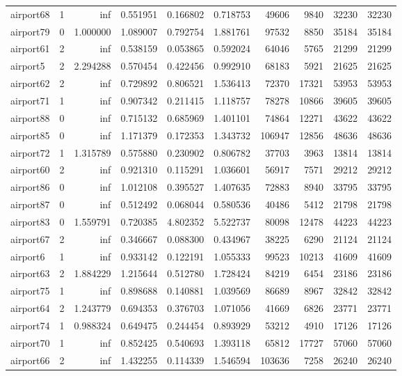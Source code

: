 \begin{longtable}{|l|r|r|r|r|r|r|r|r|r|}
airport68 & 1 & inf & 0.551951 & 0.166802 & 0.718753 & 49606 & 9840 & 32230 & 32230 \\
airport79 & 0 & 1.000000 & 1.089007 & 0.792754 & 1.881761 & 97532 & 8850 & 35184 & 35184 \\
airport61 & 2 & inf & 0.538159 & 0.053865 & 0.592024 & 64046 & 5765 & 21299 & 21299 \\
airport5 & 2 & 2.294288 & 0.570454 & 0.422456 & 0.992910 & 68183 & 5921 & 21625 & 21625 \\
airport62 & 2 & inf & 0.729892 & 0.806521 & 1.536413 & 72370 & 17321 & 53953 & 53953 \\
airport71 & 1 & inf & 0.907342 & 0.211415 & 1.118757 & 78278 & 10866 & 39605 & 39605 \\
airport88 & 0 & inf & 0.715132 & 0.685969 & 1.401101 & 74864 & 12271 & 43622 & 43622 \\
airport85 & 0 & inf & 1.171379 & 0.172353 & 1.343732 & 106947 & 12856 & 48636 & 48636 \\
airport72 & 1 & 1.315789 & 0.575880 & 0.230902 & 0.806782 & 37703 & 3963 & 13814 & 13814 \\
airport60 & 2 & inf & 0.921310 & 0.115291 & 1.036601 & 56917 & 7571 & 29212 & 29212 \\
airport86 & 0 & inf & 1.012108 & 0.395527 & 1.407635 & 72883 & 8940 & 33795 & 33795 \\
airport87 & 0 & inf & 0.512492 & 0.068044 & 0.580536 & 40486 & 5412 & 21798 & 21798 \\
airport83 & 0 & 1.559791 & 0.720385 & 4.802352 & 5.522737 & 80098 & 12478 & 44223 & 44223 \\
airport67 & 2 & inf & 0.346667 & 0.088300 & 0.434967 & 38225 & 6290 & 21124 & 21124 \\
airport6 & 1 & inf & 0.933142 & 0.122191 & 1.055333 & 99523 & 10213 & 41609 & 41609 \\
airport63 & 2 & 1.884229 & 1.215644 & 0.512780 & 1.728424 & 84219 & 6454 & 23186 & 23186 \\
airport75 & 1 & inf & 0.898688 & 0.140881 & 1.039569 & 86689 & 8967 & 32842 & 32842 \\
airport64 & 2 & 1.243779 & 0.694353 & 0.376703 & 1.071056 & 41669 & 6826 & 23771 & 23771 \\
airport74 & 1 & 0.988324 & 0.649475 & 0.244454 & 0.893929 & 53212 & 4910 & 17126 & 17126 \\
airport70 & 1 & inf & 0.852425 & 0.540693 & 1.393118 & 65812 & 17727 & 57060 & 57060 \\
airport66 & 2 & inf & 1.432255 & 0.114339 & 1.546594 & 103636 & 7258 & 26240 & 26240 \\

\end{longtable}
